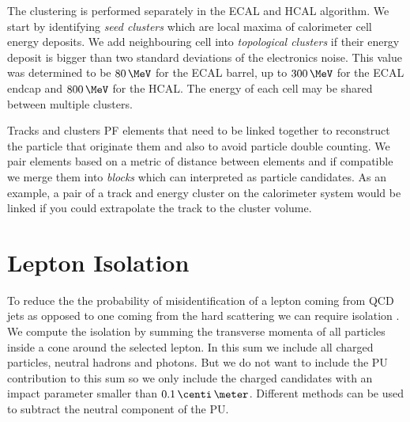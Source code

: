 The clustering is performed separately in the \gls{ECAL} and \gls{HCAL} algorithm. We start by identifying \textit{seed clusters} which are local maxima of calorimeter cell energy deposits. We add neighbouring cell into \textit{topological clusters} if their energy deposit is bigger than two standard deviations of the electronics noise. This value was determined to be $80\,\MeV$ for the \gls{ECAL} barrel, up to $300\,\MeV$ for the \gls{ECAL} endcap and $800\,\MeV$ for the \gls{HCAL}. The energy of each cell may be shared between multiple clusters.

Tracks and clusters \gls{PF} elements that need to be linked together to reconstruct the particle that originate them and also to avoid particle double counting. We pair elements based on a metric of distance between elements and if compatible we merge them into \textit{blocks} which can interpreted as particle candidates. As an example, a pair of a track and energy cluster on the calorimeter system would be linked if you could extrapolate the track to the cluster volume.


\section{Lepton Isolation}
\label{SECTION:EventReconstructionPhysicsObjects_LeptonIsolation}


To reduce the the probability of misidentification of a lepton coming from \gls{QCD} jets as opposed to one coming from the hard scattering we can require isolation \cite{ARTICLE:CMSElectronReconstruction8TeV, ARTICLE:CMSMuonReconstruction7TeV}. We compute the isolation by summing the transverse momenta of all particles inside a cone around the selected lepton. In this sum we include all charged particles, neutral hadrons and photons. But we do not want to include the \gls{PU} contribution to this sum so we only include the charged candidates with an impact parameter smaller than $0.1 \,\centi\,\meter$. Different methods can be used to subtract the neutral component of the \gls{PU}.

